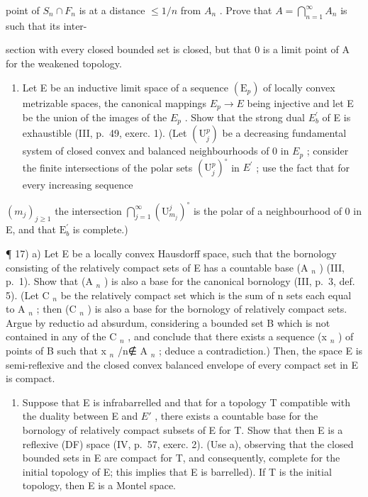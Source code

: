 point of \(S_{n} \cap F_{n}\) is at a distance \(\leqslant 1/n\) from \(A_{n}\) . Prove that \(A = \bigcap_{n=1}^{\infty} A_{n}\) is such that its inter-

section with every closed bounded set is closed, but that 0 is a limit point of A for the weakened topology.

\begin{enumerate}
\def\labelenumi{\arabic{enumi})}
\setcounter{enumi}{15}
\tightlist
\item
  Let E be an inductive limit space of a sequence \((\mathrm{E}_{p})\) of locally convex metrizable spaces, the canonical mappings \(E_{p} \rightarrow E\) being injective and let E be the union of the images of the \(E_{p}\) . Show that the strong dual \(E_{b}^{\prime}\) of E is exhaustible (III, p.~49, exerc. 1). (Let \((\mathrm{U}_{j}^{p})\) be a decreasing fundamental system of closed convex and balanced neighbourhoods of 0 in \(E_{p}\) ; consider the finite intersections of the polar sets \((\mathrm{U}_{j}^{p})^{\circ}\) in \(E^{\prime}\) ; use the fact that for every increasing sequence
\end{enumerate}

\((m_{j})_{j\geqslant 1}\) the intersection \(\bigcap_{j = 1}^{\infty}(\mathrm{U}_{m_j}^j)^{\circ}\) is the polar of a neighbourhood of 0 in E, and that \(\mathrm{E}_b^\prime\) is complete.)

¶ 17) a) Let E be a locally convex Hausdorff space, such that the bornology consisting of the relatively compact sets of E has a countable base (A \(_{n}\) ) (III, p.~1). Show that (A \(_{n}\) ) is also a base for the canonical bornology (III, p.~3, def. 5). (Let C \(_{n}\) be the relatively compact set which is the sum of n sets each equal to A \(_{n}\) ; then (C \(_{n}\) ) is also a base for the bornology of relatively compact sets. Argue by reductio ad absurdum, considering a bounded set B which is not contained in any of the C \(_{n}\) , and conclude that there exists a sequence (x \(_{n}\) ) of points of B such that x \(_{n}\) /n∉ A \(_{n}\) ; deduce a contradiction.) Then, the space E is semi-reflexive and the closed convex balanced envelope of every compact set in E is compact.

\begin{enumerate}
\def\labelenumi{\alph{enumi})}
\setcounter{enumi}{1}
\tightlist
\item
  Suppose that E is infrabarrelled and that for a topology T compatible with the duality between E and \(E'\) , there exists a countable base for the bornology of relatively compact subsets of E for T. Show that then E is a reflexive (DF) space (IV, p.~57, exerc. 2). (Use a), observing that the closed bounded sets in E are compact for T, and consequently, complete for the initial topology of E; this implies that E is barrelled). If T is the initial topology, then E is a Montel space.
\end{enumerate}

